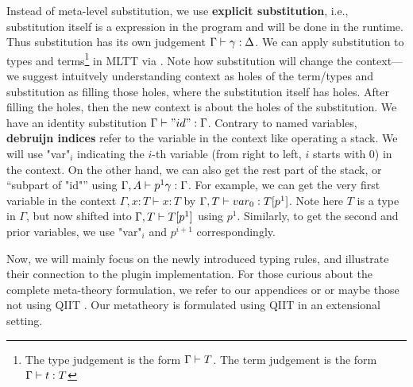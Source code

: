 Instead of meta-level substitution, we use \textbf{explicit substitution}, i.e., substitution itself is a expression in the program and will be done in the runtime. Thus substitution has its own judgement $ {\Gamma} \vdash {\gamma} : {\Delta} $. We can apply substitution to types and terms\footnote{The type judgement is the form $ {\Gamma} \vdash {T} $. The term judgement is the form $ {\Gamma} \vdash {t} : {T} $} in MLTT via .  Note how substitution will change the context---we suggest intuitvely understanding context as holes of the term/types and substitution as filling those holes, where the substitution itself has holes. After filling the holes, then the new context is about the holes of the substitution. We have an identity substitution $ {\Gamma} \vdash {"id"} : {\Gamma} $.
Contrary to named variables, \textbf{debruijn indices} refer to the variable in the context like operating a stack. We will use "var"$_i$ indicating the $i$-th variable (from right to left, $i$ starts with 0) in the context.  On the other hand, we can also get the rest part of the stack, or ``subpart of "id"'' using $ {\Gamma, A} \vdash {p^1 \gamma} : {\Gamma} $.  For example, we can get the very first variable in the context $\Gamma, x : T \vdash x : T$ by $ {\Gamma, T} \vdash {var_0} : {T[p^1]} $. Note here $T$ is a type in $\Gamma$, but now shifted into $ {\Gamma, T} \vdash {T[p^1]} $ using $p^1$. Similarly, to get the second and prior variables, we use "var"$_i$ and $p^{i+1}$ correspondingly. 


Now, we will mainly focus on the newly introduced typing rules, and illustrate their connection to the plugin implementation. For those curious about the complete meta-theory formulation, we refer to our appendices or \citet{altkap2016, kaposi2017type} or maybe those not using QIIT \cite{coquand2018canonicity, sterling2019algebraic}. Our metatheory is formulated using QIIT in an extensional setting.

